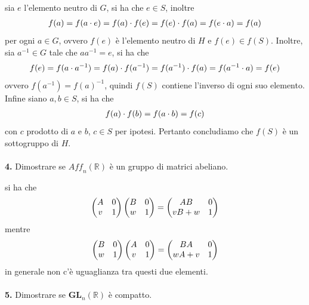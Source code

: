 \documentclass[oneside, 11pt]{amsbook}
\makeatletter
\newcommand{\0}{{(0)}}
\newcommand{\3}{{(3)}}
\theoremstyle{colonplain}
\theoremstyle{colondefinition}
\theoremstyle{colonremark}
\numberwithin{equation}{chapter}
\renewcommand{\proofname}{Dimostrazione}
\renewenvironment{proof}[1][\proofname]{\par
  \pushQED{\qed}%
  \normalfont \topsep6\p@\@plus6\p@\relax
  \trivlist
  \item[\hskip\labelsep\bfseries #1:]\ignorespaces
}{%
  \popQED\endtrivlist\@endpefalse
}
\makeatother
\begin{document}
\begin{proof} sia $e$ l'elemento neutro di $G$, si ha che $e \in S$, inoltre
\begin{align}
    f(a) = f(a \cdot e) = f(a) \cdot f(e) = f(e) \cdot f(a) = f(e \cdot a) = f(a) \notag
\end{align}
per ogni $a \in G$, ovvero $f(e)$ è l'elemento neutro di $H$ e $f(e) \in f(S)$. Inoltre, sia $a^{-1} \in G$ tale che $aa^{-1} = e$, si ha che
\begin{align}
    f(e) = f(a \cdot a^{-1}) = f(a) \cdot f(a^{-1}) = f(a^{-1}) \cdot f(a) = f(a^{-1} \cdot a) = f(e) \notag
\end{align}
ovvero $f(a^{-1}) = f(a)^{-1}$, quindi $f(S)$ contiene l'inverso di ogni suo elemento. Infine siano $a, b \in S$, si ha che
\begin{align}
    f(a) \cdot f(b) = f(a \cdot b) = f(c) \notag
\end{align}
con $c$ prodotto di $a$ e $b$, $c \in S$ per ipotesi. Pertanto concludiamo che $f(S)$ è un sottogruppo di $H$. \\ \\
\end{proof}
\textbf{4.} Dimostrare se $\textit{Aff}_n(\mathbb{R})$ è un gruppo di matrici abeliano. \\

\begin{proof} si ha che
\begin{align}
    \begin{pmatrix}
        A & 0 \\
        v & 1
    \end{pmatrix}
    \begin{pmatrix}
        B & 0 \\
        w & 1
    \end{pmatrix} = 
    \begin{pmatrix}
        AB & 0 \\
        vB + w & 1
    \end{pmatrix} \notag
\end{align}
mentre
\begin{align}
    \begin{pmatrix}
        B & 0 \\
        w & 1
    \end{pmatrix}
    \begin{pmatrix}
        A & 0 \\
        v & 1
    \end{pmatrix} = 
    \begin{pmatrix}
        BA & 0 \\
        wA + v & 1
    \end{pmatrix} \notag
\end{align}
in generale non c'è uguaglianza tra questi due elementi. \\ \\
\end{proof}
\textbf{5.} Dimostrare se $\mathbf{GL}_n(\mathbb{R})$ è compatto. \\
\end{document}
